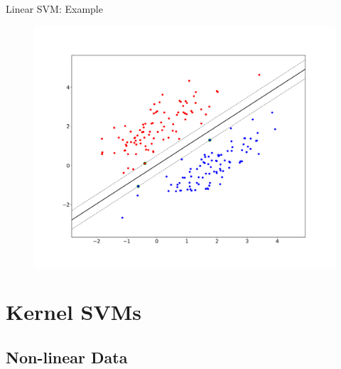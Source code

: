 \begin{frame}{Linear SVM: Example}{}
	\vspace*{-2mm}
	\begin{figure}
		\centering
		\includegraphics[scale=0.2]{11_svm/02_img/svm_linear}
	\end{figure}
\end{frame}


\section{Kernel SVMs}

\subsection{Non-linear Data}

